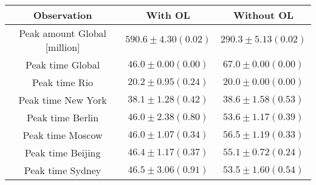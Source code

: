 \begin{tabular}[H]{c | c | c}
Observation & With OL & Without OL \\ \hline 
 Peak amount Global [million]& $590.6\pm 4.30 (0.02)$ & $290.3 \pm 5.13 (0.02)$\\ 
 Peak time Global & $46.0\pm 0.00( 0.00)$ & $67.0 \pm 0.00 (0.00)$\\ 
 Peak time Rio & $20.2\pm 0.95( 0.24)$ & $20.0 \pm 0.00 (0.00)$\\ 
 Peak time New York & $38.1\pm 1.28( 0.42)$ & $38.6 \pm 1.58 (0.53)$\\ 
 Peak time Berlin & $46.0\pm 2.38( 0.80)$ & $53.6 \pm 1.17 (0.39)$\\ 
 Peak time Moscow & $46.0\pm 1.07( 0.34)$ & $56.5 \pm 1.19 (0.33)$\\ 
 Peak time Beijing & $46.4\pm 1.17( 0.37)$ & $55.1 \pm 0.72 (0.24)$\\ 
 Peak time Sydney & $46.5\pm 3.06( 0.91)$ & $53.5 \pm 1.60 (0.54)$
\end{tabular}